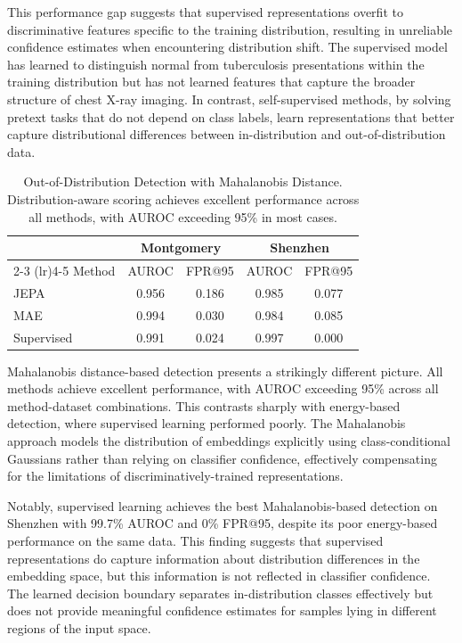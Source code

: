 \documentclass[11pt,a4paper]{article}
\begin{document}
This performance gap suggests that supervised representations overfit to discriminative features specific to the training distribution, resulting in unreliable confidence estimates when encountering distribution shift. The supervised model has learned to distinguish normal from tuberculosis presentations within the training distribution but has not learned features that capture the broader structure of chest X-ray imaging. In contrast, self-supervised methods, by solving pretext tasks that do not depend on class labels, learn representations that better capture distributional differences between in-distribution and out-of-distribution data.

\begin{table}[h]
\centering
\caption{Out-of-Distribution Detection with Mahalanobis Distance. Distribution-aware scoring achieves excellent performance across all methods, with AUROC exceeding 95\% in most cases.}
\label{tab:ood_mahal}
\begin{tabular}{@{}lcccc@{}}
\toprule
& \multicolumn{2}{c}{Montgomery} & \multicolumn{2}{c}{Shenzhen} \\
\cmidrule(lr){2-3} \cmidrule(lr){4-5}
Method & AUROC & FPR@95 & AUROC & FPR@95 \\
\midrule
JEPA & 0.956 & 0.186 & 0.985 & 0.077 \\
MAE & 0.994 & 0.030 & 0.984 & 0.085 \\
Supervised & 0.991 & 0.024 & 0.997 & 0.000 \\
\bottomrule
\end{tabular}
\end{table}

Mahalanobis distance-based detection presents a strikingly different picture. All methods achieve excellent performance, with AUROC exceeding 95\% across all method-dataset combinations. This contrasts sharply with energy-based detection, where supervised learning performed poorly. The Mahalanobis approach models the distribution of embeddings explicitly using class-conditional Gaussians rather than relying on classifier confidence, effectively compensating for the limitations of discriminatively-trained representations.

Notably, supervised learning achieves the best Mahalanobis-based detection on Shenzhen with 99.7\% AUROC and 0\% FPR@95, despite its poor energy-based performance on the same data. This finding suggests that supervised representations do capture information about distribution differences in the embedding space, but this information is not reflected in classifier confidence. The learned decision boundary separates in-distribution classes effectively but does not provide meaningful confidence estimates for samples lying in different regions of the input space.
\end{document}
